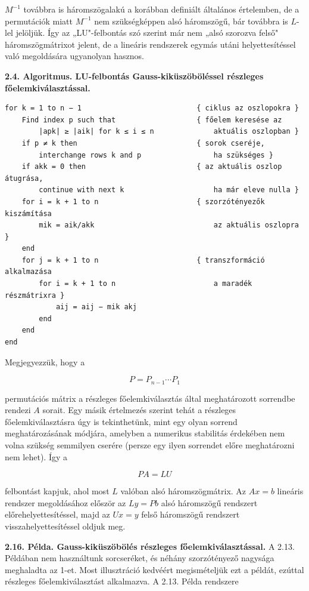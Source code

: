 \documentclass[
  magyar,
  11pt]{article}
\begin{document}
\(M^{-1}\) továbbra is háromszögalakú a korábban definiált általános
értelemben, de a permutációk miatt \(M^{-1}\) nem szükségképpen alsó
háromszögű, bár továbbra is \(L\)-lel jelöljük. Így az „LU"-felbontás
szó szerint már nem „alsó szorozva felső" háromszögmátrixot jelent, de a
lineáris rendszerek egymás utáni helyettesítéssel való megoldására
ugyanolyan hasznos.

\textbf{2.4. Algoritmus. LU-felbontás Gauss-kiküszöböléssel részleges
főelemkiválasztással.}

\begin{verbatim}
for k = 1 to n − 1                           { ciklus az oszlopokra }
    Find index p such that                   { főelem keresése az
        |apk| ≥ |aik| for k ≤ i ≤ n              aktuális oszlopban }
    if p ≠ k then                            { sorok cseréje,
        interchange rows k and p                 ha szükséges }
    if akk = 0 then                          { az aktuális oszlop átugrása,
        continue with next k                     ha már eleve nulla }
    for i = k + 1 to n                       { szorzótényezők kiszámítása
        mik = aik/akk                            az aktuális oszlopra }
    end
    for j = k + 1 to n                       { transzformáció alkalmazása
        for i = k + 1 to n                       a maradék részmátrixra }
            aij = aij − mik akj
        end
    end
end
\end{verbatim}

Megjegyezzük, hogy a

\[P = P_{n-1} \cdots P_1\]

permutációs mátrix a részleges főelemkiválasztás által meghatározott
sorrendbe rendezi \(A\) sorait. Egy másik értelmezés szerint tehát a
részleges főelemkiválasztásra úgy is tekinthetünk, mint egy olyan
sorrend meghatározásának módjára, amelyben a numerikus stabilitás
érdekében nem volna szükség semmilyen cserére (persze egy ilyen
sorrendet előre meghatározni nem lehet). Így a

\[PA = LU\]

felbontást kapjuk, ahol most \(L\) valóban alsó háromszögmátrix. Az
\(Ax = b\) lineáris rendszer megoldásához először az \(Ly = Pb\) alsó
háromszögű rendszert előrehelyettesítéssel, majd az \(Ux = y\) felső
háromszögű rendszert visszahelyettesítéssel oldjuk meg.

\textbf{2.16. Példa. Gauss-kiküszöbölés részleges főelemkiválasztással.}
A 2.13. Példában nem használtunk sorcseréket, és néhány szorzótényező
nagysága meghaladta az 1-et. Most illusztráció kedvéért megismételjük
ezt a példát, ezúttal részleges főelemkiválasztást alkalmazva. A 2.13.
Példa rendszere
\end{document}
